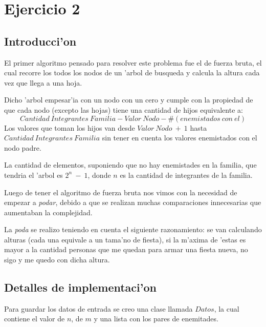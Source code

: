 \newpage
\section{Ejercicio 2}

\subsection{Introducci'on}
El primer algoritmo pensado para resolver este problema fue el de fuerza bruta, el cual recorre los todos los nodos de un 'arbol de busqueda y calcula la altura cada vez que llega a una hoja.

Dicho 'arbol empesar'ia con un nodo con un cero y cumple con la propiedad de que cada nodo (excepto las hojas) tiene una cantidad de hijos equivalente a: $$Cantidad\ Integrantes\ Familia - Valor\ Nodo - \# (enemistados\ con\ el)$$
Los valores que toman los hijos van desde $Valor\ Nodo\ +\ 1$ hasta $Cantidad\ Integrantes\ Familia$ sin tener en cuenta los valores enemistados con el nodo padre.

La cantidad de elementos, suponiendo que no hay enemistades en la familia, que tendria el 'arbol es $2^n\ -\ 1$, donde $n$ es la cantidad de integrantes de la familia.

Luego de tener el algoritmo de fuerza bruta nos vimos con la necesidad de empezar a {\it podar}, debido a que se realizan muchas comparaciones innecesarias que aumentaban la complejidad.

La {\it poda} se realizo teniendo en cuenta el siguiente razonamiento: se van calculando alturas (cada una equivale a un tama'no de fiesta), si la m'axima de 'estas es mayor a la cantidad personas que me quedan para armar una fiesta nueva, no sigo y me quedo con dicha altura.



\subsection{Detalles de implementaci'on}
Para guardar los datos de entrada se creo una clase llamada $Datos$, la cual contiene el valor de $n$, de $m$ y una lista con los pares de enemitades.

